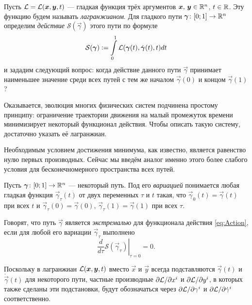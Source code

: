 Пусть $\mathcal{L} = \mathcal{L}(\boldsymbol{x}, \boldsymbol{y}, t)$ --- гладкая функция трёх аргументов $\boldsymbol{x},\,\boldsymbol{y} \in \mathbb{R}^n$, $t \in \mathbb{R}$. Эту функцию будем называть \textit{лагранжианом}. Для гладкого пути $\boldsymbol{\gamma}\colon [0; 1] \to \mathbb{R}^n$ определим \textit{действие} $\mathcal{S}(\vec{\gamma})$ этого пути по формуле
\begin{equation} \label{eq:Action}
	\mathcal{S}(\boldsymbol{\gamma}) \vcentcolon = \int\limits_0^1\mathcal{L}(\boldsymbol{\gamma}(t), \dot{\boldsymbol{\gamma}}(t), t)dt
\end{equation}
и зададим следующий вопрос: когда действие данного пути $\vec{\gamma}$ принимает наименьшее значение среди всех путей с тем же началом $\vec{\gamma}(0)$ и концом $\vec{\gamma}(1)$?

Оказывается, эволюция многих физических систем подчинена простому принципу: ограничение траектории движения на малый промежуток времени минимизирует некоторый функционал действия\footnotemark{}. Чтобы описать такую систему, достаточно указать её лагранжиан.


Необходимым условием достижения минимума, как известно, является равенство нулю первых производных. Сейчас мы введём аналог именно этого более слабого условия для бесконечномерного пространства всех путей.

\begin{definition}
	Пусть $\boldsymbol{\gamma}\colon [0; 1] \to \mathbb{R}^n$ --- некоторый путь. Под его \textit{вариацией} понимается любая гладкая функция $\vec{\gamma}_\tau(t)$ от двух переменных $\tau$ и $t$ такая, что $\vec{\gamma}_0(t) = \vec{\gamma}(t)$ при всех $t$ и $\vec{\gamma}_\tau(0) = \vec{\gamma}(0)$, $\vec{\gamma}_\tau(1) = \vec{\gamma}(1)$ при всех $\tau$.

	Говорят, что путь $\vec{\gamma}$ является \textit{экстремалью} для функционала действия \eqref{eq:Action}, если для любой его вариации $\vec{\gamma}_\tau$ выполнено
	\[
		\left.\frac{d}{d\tau}\mathcal{S}(\vec{\gamma}_\tau)\right|_{\tau = 0} = 0.
	\]
\end{definition}

Поскольку в лагранжиан $\mathcal{L}(\boldsymbol{x}, \boldsymbol{y}, t)$ вместо $\vec{x}$ и $\vec{y}$ всегда подставляются $\vec{\gamma}(t)$ и $\dot{\vec{\gamma}}(t)$ для некоторого пути, частные производные $\partial\mathcal{L} / \partial x^i$ и $\partial\mathcal{L} / \partial y^i$, в которых также сделаны эти подстановки, будут обозначаться через $\partial\mathcal{L} / \partial\gamma^i$ и $\partial\mathcal{L} / \partial\dot{\gamma}^i$ соответственно.

